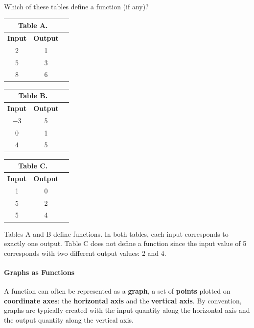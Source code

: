 \begin{example}

Which of these tables define a function (if any)?

\begin{center}
\begin{tabular}{ccc}
\multicolumn{2}{c}{Table A.}\\
\toprule
{\bf Input} & {\bf Output}\\
\toprule
2 & 1 \\
\midrule
5 & 3 \\
\midrule
8 & 6 \\
\bottomrule
\end{tabular}
\quad
\begin{tabular}{ccc}
\multicolumn{2}{c}{Table B.}\\
\toprule
{\bf Input} & {\bf Output}\\
\toprule
$-3$ & 5 \\
\midrule
0 & 1 \\
\midrule
4 & 5 \\
\bottomrule
\end{tabular}
\quad
\begin{tabular}{ccc}
\multicolumn{2}{c}{Table C.}\\
\toprule
{\bf Input} & {\bf Output}\\
\toprule
1 & 0 \\
\midrule
5 & 2 \\
\midrule
5 & 4 \\
\bottomrule
\end{tabular}
\end{center}

\solution Tables A and B define functions. In both tables, each input corresponds to exactly one output. Table C does not define a function since the input value of 5 corresponds with two different
output values: 2 and 4.
\end{example}



\paragraph{Graphs as Functions}

A function can often be represented as a {\bf graph}, a set of {\bf points} plotted on {\bf coordinate axes}: the {\bf horizontal axis} and the {\bf vertical axis}. By convention, graphs are typically created with the input quantity along the horizontal axis and the output quantity along the vertical axis.

